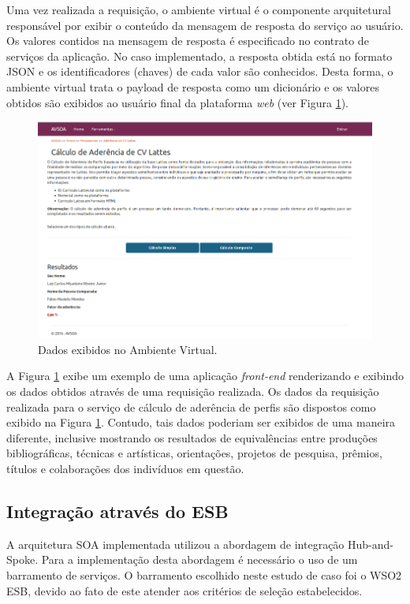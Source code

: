 Uma vez realizada a requisição, o ambiente virtual é o componente arquitetural responsável por exibir o conteúdo da mensagem de resposta do serviço ao usuário. Os valores contidos na mensagem de resposta é especificado no contrato de serviços da aplicação. No caso implementado, a resposta obtida está no formato JSON e os identificadores (chaves) de cada valor são conhecidos. Desta forma, o ambiente virtual trata o payload de resposta como um dicionário e os valores obtidos são exibidos ao usuário final da plataforma \textit{web} (ver Figura \ref{print_ambiente_virtual}).

\begin{figure}[!hbt]
\centering
\includegraphics[scale=0.7]{figuras/print_avsoa.png}
\caption{Dados exibidos no Ambiente Virtual.}
\label{print_ambiente_virtual}
\end{figure}

A Figura \ref{print_ambiente_virtual} exibe um exemplo de uma aplicação \textit{front-end} renderizando e exibindo os dados obtidos através de uma requisição realizada. Os dados da requisição realizada para o serviço de cálculo de aderência de perfis são dispostos como exibido na Figura \ref{print_ambiente_virtual}. Contudo, tais dados poderiam ser exibidos de uma maneira diferente, inclusive mostrando os resultados de equivalências entre produções bibliográficas, técnicas e artísticas, orientações, projetos de pesquisa, prêmios, títulos e colaborações dos indivíduos em questão.

\subsection{Integração através do ESB}
A arquitetura SOA implementada utilizou a abordagem de integração Hub-and-Spoke. Para a implementação desta abordagem é necessário o uso de um barramento de serviços. O barramento escolhido neste estudo de caso foi o WSO2 ESB, devido ao fato de este atender aos critérios de seleção estabelecidos. 

